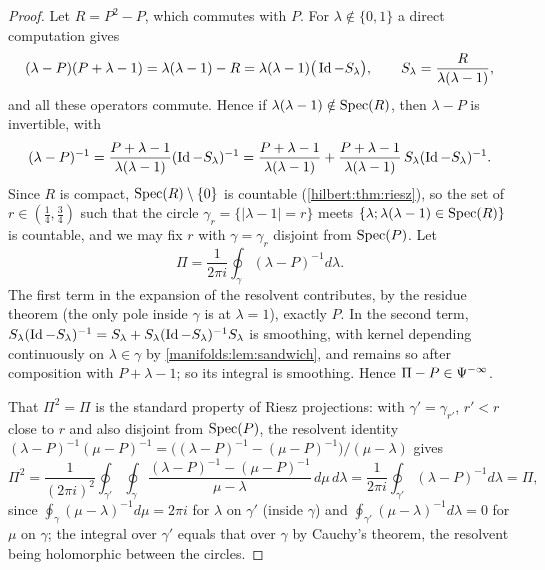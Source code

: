\begin{proof}
Let $R=P^2-P$, which commutes with $P$. For $\lambda\notin\{0,1\}$ a direct computation gives
\begin{equation}\label{manifolds:eq:projection-resolvent}
(\lambda-P)(P+\lambda-1)=\lambda(\lambda-1)-R=\lambda(\lambda-1)\big(\operatorname{Id}-S_\lambda\big),\qquad
S_\lambda=\frac R{\lambda(\lambda-1)},
\end{equation}
and all these operators commute. Hence if $\lambda(\lambda-1)\notin\operatorname{Spec}(R)$, then
$\lambda-P$ is invertible, with
\begin{equation*}
(\lambda-P)^{-1}=\frac{P+\lambda-1}{\lambda(\lambda-1)}(\operatorname{Id}-S_\lambda)^{-1}
=\frac{P+\lambda-1}{\lambda(\lambda-1)}+\frac{P+\lambda-1}{\lambda(\lambda-1)}\,S_\lambda(\operatorname{Id}-S_\lambda)^{-1}.
\end{equation*}
Since $R$ is compact, $\operatorname{Spec}(R)\setminus\{0\}$ is countable (\cref{hilbert:thm:riesz}), so the
set of $r\in(\frac14,\frac34)$ such that the circle $\gamma_r=\{|\lambda-1|=r\}$ meets
$\{\lambda;\lambda(\lambda-1)\in\operatorname{Spec}(R)\}$ is countable, and we may fix $r$ with $\gamma=\gamma_r$
disjoint from $\operatorname{Spec}(P)$. Let
\begin{equation*}
\Pi=\frac1{2\pi i}\oint_\gamma(\lambda-P)^{-1}d\lambda .
\end{equation*}
The first term in the expansion of the resolvent contributes, by the residue
theorem (the only pole inside $\gamma$ is at $\lambda=1$), exactly $P$. In the second term,
$S_\lambda(\operatorname{Id}-S_\lambda)^{-1}=S_\lambda+S_\lambda(\operatorname{Id}-S_\lambda)^{-1}S_\lambda$ is smoothing, with kernel
depending continuously on $\lambda\in\gamma$ by \cref{manifolds:lem:sandwich}, and remains so
after composition with $P+\lambda-1$; so its integral is smoothing. Hence
$\Pi-P\in\Psi^{-\infty}$.

That $\Pi^2=\Pi$ is the standard property of Riesz projections: with $\gamma'=\gamma_{r'}$,
$r'<r$ close to $r$ and also disjoint from $\operatorname{Spec}(P)$, the resolvent identity
$(\lambda-P)^{-1}(\mu-P)^{-1}=\big((\lambda-P)^{-1}-(\mu-P)^{-1}\big)/(\mu-\lambda)$ gives
\begin{equation*}
\Pi^2=\frac1{(2\pi i)^2}\oint_{\gamma'}\oint_\gamma\frac{(\lambda-P)^{-1}-(\mu-P)^{-1}}{\mu-\lambda}\,d\mu\,d\lambda
=\frac1{2\pi i}\oint_{\gamma'}(\lambda-P)^{-1}d\lambda=\Pi,
\end{equation*}
since $\oint_\gamma(\mu-\lambda)^{-1}d\mu=2\pi i$ for $\lambda$ on $\gamma'$ (inside $\gamma$) and
$\oint_{\gamma'}(\mu-\lambda)^{-1}d\lambda=0$ for $\mu$ on $\gamma$; the integral over $\gamma'$ equals that
over $\gamma$ by Cauchy's theorem, the resolvent being holomorphic between the circles.
\end{proof}

